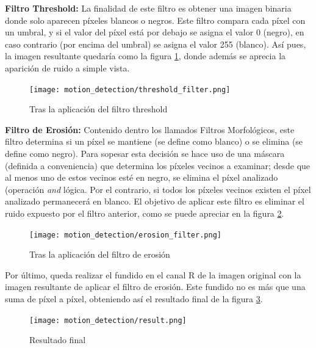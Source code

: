 \documentclass[twoside]{article}
\begin{document}
\textbf{Filtro Threshold:} La finalidad de este filtro es obtener una imagen binaria donde solo aparecen píxeles blancos o negros. Este filtro compara cada píxel con un umbral, y si el valor del píxel está por debajo se asigna el valor 0 (negro), en caso contrario (por encima del umbral) se asigna el valor 255 (blanco). Así pues, la imagen resultante quedaría como la figura \ref{fig:threshold_filter}, donde además se aprecia la aparición de ruido a simple vista.

\begin{figure}
   \begin{center}
      \texttt{[image: motion\_detection/threshold\_filter.png]}
      \caption{\label{fig:threshold_filter}Tras la aplicación del filtro threshold}
   \end{center}
\end{figure}

\textbf{Filtro de Erosión:} Contenido dentro los llamados Filtros Morfológicos, este filtro determina si un píxel se mantiene (se define como blanco) o se elimina (se define como negro). Para sopesar esta decisión se hace uso de una máscara (definida a conveniencia) que determina los píxeles vecinos a examinar; desde que al menos uno de estos vecinos esté en negro, se elimina el píxel analizado (operación \emph{and} lógica. Por el contrario, si todos los píxeles vecinos existen el píxel analizado permanecerá en blanco. El objetivo de aplicar este filtro es eliminar el ruido expuesto por el filtro anterior, como se puede apreciar en la figura \ref{fig:erosion_filter}.

\begin{figure}
   \begin{center}
      \texttt{[image: motion\_detection/erosion\_filter.png]}
      \caption{\label{fig:erosion_filter}Tras la aplicación del filtro de erosión}
   \end{center}
\end{figure}

Por último, queda realizar el fundido en el canal R de la imagen original con la imagen resultante de aplicar el filtro de erosión. Este fundido no es más que una suma de píxel a píxel, obteniendo así el resultado final de la figura \ref{fig:result}.
 
\begin{figure}
   \begin{center}
      \texttt{[image: motion\_detection/result.png]}
      \caption{\label{fig:result}Resultado final}
   \end{center}
\end{figure}
\end{document}

